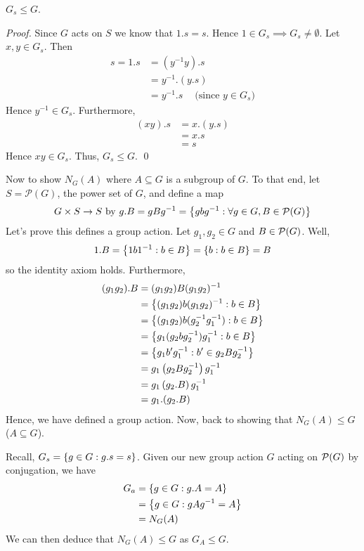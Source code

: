 \begin{theorem}
    $G_s \leq G$.
\end{theorem}

\begin{proof}
    Since $G$ acts on $S$ we know that $1.s = s$. Hence $1 \in G_s \implies G_s \not = \emptyset$. Let $x,y \in G_s$. Then 
    \begin{align*}
        s = 1.s &= (y^{-1}y).s \\ 
        &= y^{-1}.(y.s) \\ 
        &= y^{-1}.s ~~~~\text{ (since $y \in G_s$)}
    \end{align*}
    Hence $y^{-1} \in G_s$. Furthermore, 
    \begin{align*}
        (xy).s &= x.(y.s) \\
        &= x.s \\ 
        &= s
    \end{align*}
    Hence $xy \in G_s$. Thus, $G_s \leq G$.
    \qed
\end{proof}

Now to show $N_G(A)$ where $A \subseteq G$ is a subgroup of $G$. To that end, let $S = \mathcal{P}(G)$, the power set of $G$, and define a map
$$G\times S \to S \text{ by } g.B = gBg^{-1} = \left\{gbg^{-1}:\forall g \in G, B \in \mathcal{P}(G)\right\}$$
Let's prove this defines a group action.
Let $g_1, g_2 \in G$ and $B \in \mathcal{P}(G)$. Well,
$$1.B = \left\{1b1^{-1} : b \in B\right\} = \left\{b : b \in B\right\} = B$$
so the identity axiom holds. Furthermore,
\begin{align*}
    (g_1g_2).B &= (g_1g_2)B(g_1g_2)^{-1} \\
    &= \left\{(g_1g_2)b(g_1g_2)^{-1} : b \in B\right\} \\
    &= \left\{(g_1g_2)b(g_2^{-1}g_1^{-1}) : b \in B\right\} \\
    &= \left\{g_1(g_2b g_2^{-1})g_1^{-1} : b \in B\right\} \\
    &= \left\{g_1b'g_1^{-1} : b' \in g_2Bg_2^{-1}\right\} \\
    &= g_1 \left(g_2Bg_2^{-1}\right)g_1^{-1} \\
    &= g_1\left(g_2.B\right)g_1^{-1} \\
    &= g_1.(g_2.B)
\end{align*}
Hence, we have defined a group action. Now, back to showing that $N_G(A) \leq G$ ($A \subseteq G$).

Recall, $G_s = \left\{g \in G : g.s=s\right\}$. Given our new group action $G$ acting on $\mathcal{P}(G)$ by conjugation, we have 
\begin{align*}
    G_a &= \left\{g \in G : g.A = A\right\} \\
    &= \left\{g \in G : gAg^{-1} = A\right\} \\
    &= N_G(A)
\end{align*}
We can then deduce that $N_G(A) \leq G$ as $G_A \leq G$.